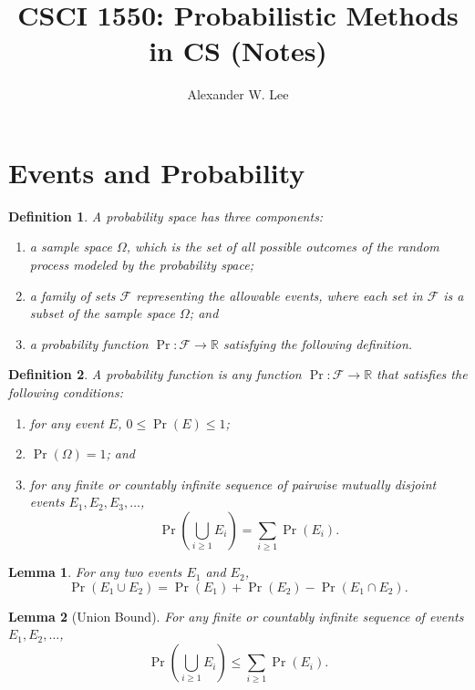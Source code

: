 \documentclass{amsart}
\title{CSCI 1550: Probabilistic Methods in CS (Notes)}
\author{Alexander W. Lee}
\newtheorem*{definition}{Definition}
\newtheorem*{lemma}{Lemma}
\newcommand{\R}{\mathbb{R}}
\begin{document}
\maketitle


\section{Events and Probability}

\begin{definition}
  A probability space has three components:
  \begin{enumerate}
    \item a sample space $\Omega$, which is the set of all possible outcomes of
      the random process modeled by the probability space;
    \item a family of sets $\mathcal{F}$ representing the allowable events,
      where each set in $\mathcal{F}$ is a subset of the sample space $\Omega$;
      and
    \item a probability function $\Pr: \mathcal{F} \to \R$ satisfying the
      following definition.
  \end{enumerate}
\end{definition}

\begin{definition}
  A probability function is any function $\Pr: \mathcal{F} \to \R$ that
  satisfies the following conditions:
  \begin{enumerate}
    \item for any event $E$, $0 \leq \Pr(E) \leq 1$;
    \item $\Pr(\Omega) = 1$; and
    \item for any finite or countably infinite sequence of pairwise mutually
      disjoint events $E_1, E_2, E_3, \ldots$,
      \[
        \Pr \left( \bigcup_{i \geq 1} E_i \right) = \sum_{i \geq 1} \Pr(E_i).
      \]
  \end{enumerate}
\end{definition}

\begin{lemma}
  For any two events $E_1$ and $E_2$,
  \[
    \Pr(E_1 \cup E_2) = \Pr(E_1) + \Pr(E_2) - \Pr(E_1 \cap E_2).
  \]
\end{lemma}

\begin{lemma}[Union Bound]
  For any finite or countably infinite sequence of events $E_1, E_2, \ldots$,
  \[
    \Pr \left( \bigcup_{i \geq 1} E_i \right) \leq \sum_{i \geq 1} \Pr(E_i).
  \]
\end{lemma}
\end{document}
